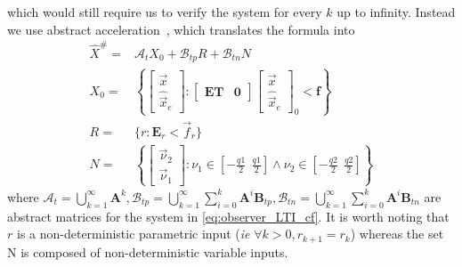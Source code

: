 \documentclass[runningheads,a4paper]{llncs}
\newcommand{\mat}[1]{\boldsymbol{#1}}
\begin{document}
which would still require us to verify the system for every $k$ up to infinity. 
Instead we use abstract acceleration~\cite{cattaruzza2015unbounded}, which translates the formula into
%
\begin{align}
\label{eq:aa_observer_LTI_cf}
\hat{X}^\#
=&\mathcal{A}_t X_0+\mathcal{B}_{tp} R + \mathcal{B}_{tn} N\\
X_0 =&\left \{ \left[\begin{array}{c}\vec{x}\\ \hat{\vec{x}}_e \end{array}\right] :
 \left [\begin{array}{cc}\mat{E}\mat{T}&\mat{0}\end{array}\right] \left [\begin{array}{c}\vec{x}\\ \hat{\vec{x}}_e \end{array}\right]_0<\mat{f} \right\}\nonumber\\
 R =&\{r : \mat{E}_r < \vec{f}_r \}\nonumber\\
 N=&\left \{ \left[\begin{array}{c}\vec{\nu}_2\\ \vec{\nu}_1\end{array}\right] : \nu_1 \in \left[-\frac{q1}{2}\ \ \frac{q1}{2}\right] \wedge \nu_2 \in \left[-\frac{q2}{2}\ \ \frac{q2}{2}\right]  \right \}\nonumber
\end{align}
%
where $\mathcal{A}_t=\bigcup_{k=1}^\infty \mat{A}^k, \mathcal{B}_{tp}=\bigcup_{k=1}^\infty \sum_{i=0}^k\mat{A}^i\mat{B}_{tp}, \mathcal{B}_{tn}=\bigcup_{k=1}^\infty \sum_{i=0}^k\mat{A}^i\mat{B}_{tn}$ are abstract matrices for the system in \eqref{eq:observer_LTI_cf}. It is worth noting that $r$ is a non-deterministic parametric input (\emph{ie} $\forall k>0, r_{k+1} =r_k$) whereas the set N is composed of non-deterministic variable inputs.


\end{document}
